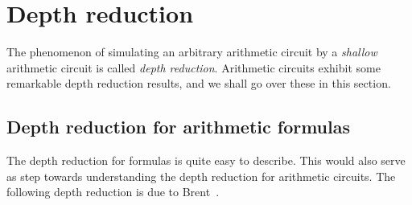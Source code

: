 \chapter{Depth reduction}

The phenomenon of simulating an arbitrary arithmetic circuit by a \emph{shallow} arithmetic circuit is called \emph{depth reduction}. 
Arithmetic circuits exhibit some remarkable depth reduction results, and we shall go over these in this section. 

\section{Depth reduction for arithmetic formulas}

The depth reduction for formulas is quite easy to describe. 
This would also serve as step towards understanding the depth reduction for arithmetic circuits. 
The following depth reduction is due to Brent~\cite{brent74}. 

